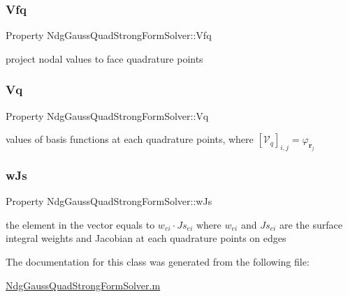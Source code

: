 \subsubsection{\texorpdfstring{Vfq}{Vfq}}
{\footnotesize\ttfamily Property Ndg\+Gauss\+Quad\+Strong\+Form\+Solver\+::\+Vfq}



project nodal values to face quadrature points 

\mbox{\label{class_ndg_gauss_quad_strong_form_solver_a253efb18a8ea4ca601f7939ae6fde2d6}} 
\subsubsection{\texorpdfstring{Vq}{Vq}}
{\footnotesize\ttfamily Property Ndg\+Gauss\+Quad\+Strong\+Form\+Solver\+::\+Vq}

values of basis functions at each quadrature points, where $ [ \mathcal{V}_q ]_{i,j} = \varphi_{ \mathbf{r}_j } $ \mbox{\label{class_ndg_gauss_quad_strong_form_solver_a9bd343fd405d78c7419540d31a9cf131}} 
\subsubsection{\texorpdfstring{w\+Js}{wJs}}
{\footnotesize\ttfamily Property Ndg\+Gauss\+Quad\+Strong\+Form\+Solver\+::w\+Js}

the element in the vector equals to $ w_{ei} \cdot Js_{ei} $ where $ w_{ei} $ and $ Js_{ei} $ are the surface integral weights and Jacobian at each quadrature points on edges 

The documentation for this class was generated from the following file\+:\begin{DoxyCompactItemize}
\item 
\hyperlink{_ndg_gauss_quad_strong_form_solver_8m}{Ndg\+Gauss\+Quad\+Strong\+Form\+Solver.\+m}\end{DoxyCompactItemize}
